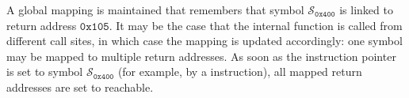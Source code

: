A global mapping is maintained that remembers that symbol $\mathcal{S}_\mathtt{0x400}$ is linked to return address $\mathtt{0x105}$.
It may be the case that the internal function is called from different call sites, in which case the mapping is updated accordingly: one symbol may be mapped to multiple return addresses.
As soon as the instruction pointer is set to symbol $\mathcal{S}_\mathtt{0x400}$ (for example, by a  instruction), all mapped return addresses are set to reachable.

\begin{comment}
  To summarize, for the internal function call above, the following actions are undertaken:
  \begin{enumerate}
    \item Clean the current symbolic state and add it -- with \texttt{rip} set to \texttt{0x105} -- to the bag.
    However, it is marked as \emph{unreachable}.
    \item Add an empty state to the bag, with a return symbol $\mathcal{S}_\mathtt{0x400}$ pushed to the top of the stack.
    \item Add return address \texttt{0x105} to the set of addresses mapped to symbol $\mathcal{S}_\mathtt{0x400}$.
    \item As soon as an instruction sets \texttt{rip} to the symbol $\mathcal{S}_\mathtt{0x400}$, any symbolic state whose \texttt{rip} is in the set of return addresses mapped to this symbol is set to reachable.
  \end{enumerate}
\end{comment}
